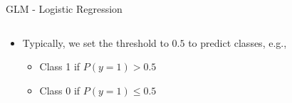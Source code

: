 \documentclass[11pt,compress,t,notes=noshow, aspectratio=169, xcolor=table]{beamer}
\begin{document}
\begin{frame}{GLM - Logistic Regression}
\begin{columns}[T, totalwidth=\textwidth]
\begin{column}{0.38\textwidth}
\end{column}
\end{columns}

\begin{itemize}
    \item<2-> Typically, we set the threshold to $0.5$ to predict classes, e.g.,
        \begin{itemize}
            \item Class 1 if $P(y=1) > 0.5$
            \item Class 0 if $P(y=1) \leq 0.5$
        \end{itemize}
\end{itemize}
\end{frame}


\end{document}
